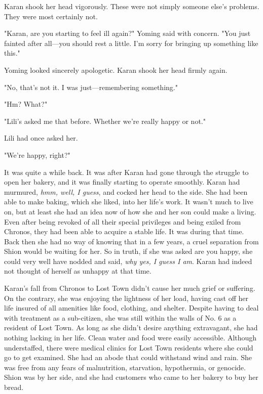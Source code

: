 Karan shook her head vigorously. These were not simply someone else's
problems. They were most certainly not.

"Karan, are you starting to feel ill again?" Yoming said with concern.
"You just fainted after all---you should rest a little. I'm sorry for
bringing up something like this."

Yoming looked sincerely apologetic. Karan shook her head firmly again.

"No, that's not it. I was just---remembering something."

"Hm? What?"

"Lili's asked me that before. Whether we're really happy or not."

Lili had once asked her.

"We're happy, right?"

It was quite a while back. It was after Karan had gone through the
struggle to open her bakery, and it was finally starting to operate
smoothly. Karan had murmured, \emph{hmm, well, I guess}, and cocked her head to
the side. She had been able to make baking, which she liked, into her
life's work. It wasn't much to live on, but at least she had an idea now
of how she and her son could make a living. Even after being revoked of
all their special privileges and being exiled from Chronos, they had
been able to acquire a stable life. It was during that time. Back then
she had no way of knowing that in a few years, a cruel separation from
Shion would be waiting for her. So in truth, if she was asked are you
happy, she could very well have nodded and said, \emph{why yes, I guess I am}.
Karan had indeed not thought of herself as unhappy at that time.

Karan's fall from Chronos to Lost Town didn't cause her much grief or
suffering. On the contrary, she was enjoying the lightness of her load,
having cast off her life insured of all amenities like food, clothing,
and shelter. Despite having to deal with treatment as a sub-citizen, she
was still within the walls of No. 6 as a resident of Lost Town. As long
as she didn't desire anything extravagant, she had nothing lacking in
her life. Clean water and food were easily accessible. Although
understaffed, there were medical clinics for Lost Town residents where
she could go to get examined. She had an abode that could withstand wind
and rain. She was free from any fears of malnutrition, starvation,
hypothermia, or genocide. Shion was by her side, and she had customers
who came to her bakery to buy her bread.

